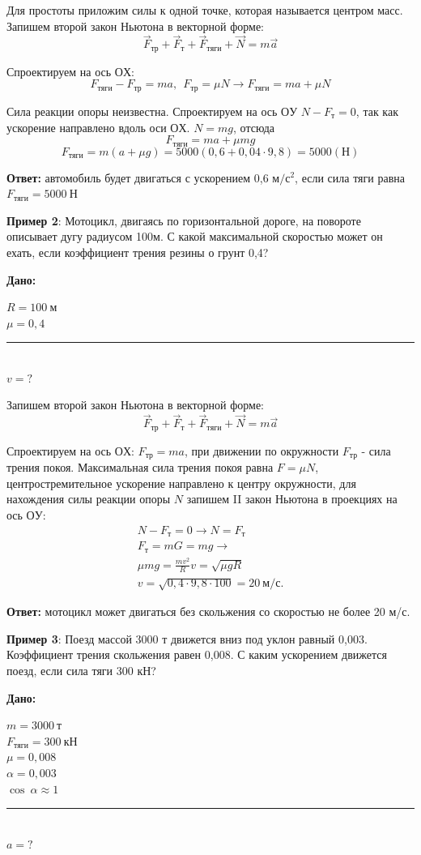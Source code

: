 \documentclass[a6paper, 11pt]{diss_4}
\renewcommand{\'}{\,'}
\begin{document}
Для простоты приложим силы к одной точке, которая называется центром масс. Запишем второй закон Ньютона в векторной форме:
\[
\vec{F}_{тр}+\vec{F}_{т}+\vec{F}_{тяги}+\vec{N}=m\vec{a}
\]

Спроектируем на ось $ОХ$:
\[
F_{тяги}-F_{тр}=ma,\ \ F_{тр}=\mu N\to
F_{тяги}=ma+\mu N
\]

Сила реакции опоры неизвестна. Спроектируем на ось $ОУ$   $N-F_т=0$, так как ускорение направлено вдоль оси $ОХ$.  $N=mg$, отсюда
\[
F_{тяги} = ma+ \mu mg
\]
\[
F_{тяги} = m(a+ \mu g)=5000(0,6+0,04\cdot9,8)=5000 (Н)
\]

\textbf{Ответ:} автомобиль будет двигаться с ускорением 0,6 $м/с^2$, если сила тяги  равна $F_{тяги} = 5000\ Н$

\textbf{Пример 2}: Мотоцикл, двигаясь по горизонтальной дороге, на повороте описывает дугу радиусом 100м. С какой максимальной скоростью может он ехать, если коэффициент трения резины о грунт 0,4?

\hspace{1cm}\textbf{Дано:}\hspace{.3cm}
\parbox[t]{4cm}{
$R=100\ м$\\
$\mu = 0,4$\\
\rule{4cm}{.4pt}\\
$v = ?$\\
}

Запишем второй закон Ньютона в векторной форме:
\[
\vec{F}_{тр}+\vec{F}_{т}+\vec{F}_{тяги}+\vec{N}=m\vec{a}
\]

Спроектируем на ось $ОХ$:
$F_{тр} = ma$, при движении по окружности $F_{тр}$ - сила трения покоя. Максимальная сила трения покоя равна $F=\mu N$, центростремительное ускорение направлено к центру окружности, для нахождения силы реакции опоры $N$ запишем  II закон Ньютона в проекциях  на ось $ОУ$:
\begin{gather*}
N-F_т=0\to N=F_т\\
F_т=mG=mg\to\\
\mu mg=\frac{mv^2}{R}v=\sqrt{\mu gR}\\
v=\sqrt{0,4\cdot9,8\cdot100}=20\ м/с.
\end{gather*}

\textbf{Ответ:} мотоцикл может двигаться без скольжения со скоростью не более 20 м/с.

\textbf{Пример 3}: Поезд массой 3000 т движется вниз под уклон равный 0,003. Коэффициент трения  скольжения равен 0,008. С каким ускорением движется поезд, если сила тяги 300 кН?

\hspace{1cm}\textbf{Дано:}\hspace{.3cm}
\parbox[t]{4cm}{
$m = 3000\ т$\\
$F_{тяги} = 300\ кН$\\
$\mu = 0,008$\\
$\alpha=0,003$\\
$\cos\ \alpha\approx1$\\
\rule{4cm}{.4pt}\\
$a = ?$\\
}
\end{document}
